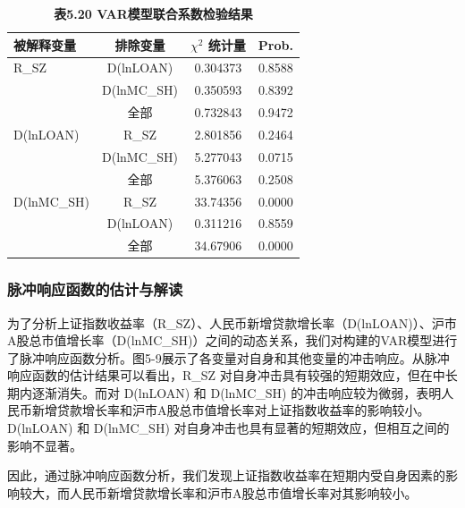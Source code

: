 \documentclass[12pt, a4paper]{article}
\numberwithin{equation}{section}
\begin{document}
\begin{table}[h!]
    \centering
    \captionsetup{labelformat=empty}
    \caption{\textbf{\fontsize{9pt}{11pt}\selectfont 表5.20 VAR模型联合系数检验结果}}
    \begin{tabular}{lccc}
        \toprule
        被解释变量       & 排除变量        & $\chi^2$ 统计量 & Prob.  \\
        \midrule
        R\_SZ       & D(lnLOAN)   & 0.304373     & 0.8588 \\
                    & D(lnMC\_SH) & 0.350593     & 0.8392 \\
                    & 全部          & 0.732843     & 0.9472 \\
        D(lnLOAN)   & R\_SZ       & 2.801856     & 0.2464 \\
                    & D(lnMC\_SH) & 5.277043     & 0.0715 \\
                    & 全部          & 5.376063     & 0.2508 \\
        D(lnMC\_SH) & R\_SZ       & 33.74356     & 0.0000 \\
                    & D(lnLOAN)   & 0.311216     & 0.8559 \\
                    & 全部          & 34.67906     & 0.0000 \\
        \bottomrule
    \end{tabular}
\end{table}



\subsubsection{脉冲响应函数的估计与解读}

为了分析上证指数收益率（R\_SZ）、人民币新增贷款增长率（D(lnLOAN)）、沪市A股总市值增长率（D(lnMC\_SH)）之间的动态关系，我们对构建的VAR模型进行了脉冲响应函数分析。图5-9展示了各变量对自身和其他变量的冲击响应。从脉冲响应函数的估计结果可以看出，R\_SZ 对自身冲击具有较强的短期效应，但在中长期内逐渐消失。而对 D(lnLOAN) 和 D(lnMC\_SH) 的冲击响应较为微弱，表明人民币新增贷款增长率和沪市A股总市值增长率对上证指数收益率的影响较小。D(lnLOAN) 和 D(lnMC\_SH) 对自身冲击也具有显著的短期效应，但相互之间的影响不显著。

因此，通过脉冲响应函数分析，我们发现上证指数收益率在短期内受自身因素的影响较大，而人民币新增贷款增长率和沪市A股总市值增长率对其影响较小。
\end{document}
